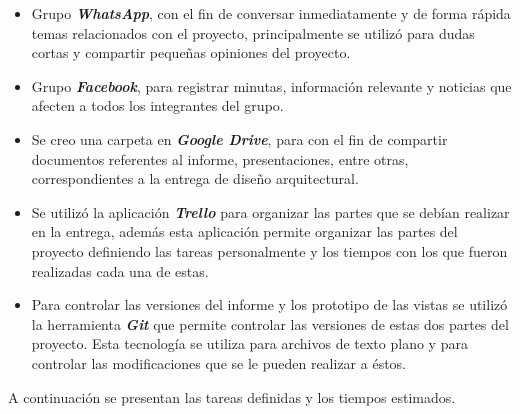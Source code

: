 \documentclass{memoria}
\begin{document}
\begin{itemize}
	\item Grupo \textbf{\textsl{WhatsApp}}, con el fin de conversar inmediatamente y de forma rápida temas relacionados con el proyecto, principalmente se utilizó para dudas cortas y compartir pequeñas opiniones del proyecto.
	\item Grupo \textbf{\textsl{Facebook}}, para registrar minutas, información relevante y noticias que afecten a todos los integrantes del grupo.
	\item Se creo una carpeta en \textbf{\textsl{Google Drive}}, para con el fin de compartir documentos referentes al informe, presentaciones, entre otras, correspondientes a la entrega de diseño arquitectural.  
	\item Se utilizó la aplicación \textbf{\textsl{Trello}} para organizar las partes que se debían realizar en la entrega, además esta aplicación permite organizar las partes del proyecto definiendo las tareas personalmente y los tiempos con los que fueron realizadas cada una de estas.
	\item Para controlar las versiones del informe y los prototipo de las vistas se utilizó la herramienta \textbf{\textsl{Git}} que permite controlar las versiones de estas dos partes del proyecto. Esta tecnología se utiliza para archivos de texto plano y para controlar las modificaciones que se le pueden realizar a éstos.
\end{itemize}

\newpage

A continuación se presentan las tareas definidas y los tiempos estimados.

\end{document}
